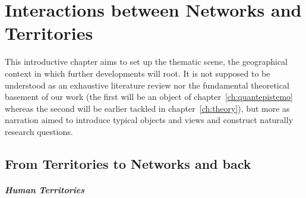 





\chapter{Interactions between Networks and Territories} %

\label{ch:thematic} %


%






\bigskip

This introductive chapter aims to set up the thematic scene, the geographical context in which further developments will root. It is not supposed to be understood as an exhaustive literature review nor the fundamental theoretical basement of our work (the first will be an object of chapter~\ref{ch:quantepistemo} whereas the second will be earlier tackled in chapter~\ref{ch:theory}), but more as narration aimed to introduce typical objects and views and construct naturally research questions.

\section{From Territories to Networks and back}


\paragraph{Human Territories}

